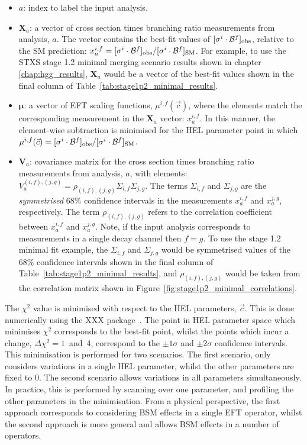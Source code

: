 \begin{itemize}
    \item $a$: index to label the input analysis.
    \item $\mathbf{X}_a$: a vector of cross section times branching ratio measurements from analysis, $a$. The vector contains the best-fit values of $[\sigma^i\cdot\mathcal{B}^f]_{\rm{obs}}$, relative to the SM prediction: $x^{i,f}_a=[\sigma^i\cdot\mathcal{B}^f]_{\rm{obs}}/[\sigma^i\cdot\mathcal{B}^f]_{\rm{SM}}$. For example, to use the \Hgg STXS stage 1.2 minimal merging scenario results shown in chapter \ref{chap:hgg_results}, $\mathbf{X}_a$ would be a vector of the best-fit values shown in the final column of Table~\ref{tab:stage1p2_minimal_results}.
    \item $\pmb{\mu}$: a vector of EFT scaling functions, $\mu^{i,f}(\vec{c})$, where the elements match the corresponding measurement in the $\mathbf{X}_a$ vector: $x^{i,f}_a$. In this manner, the element-wise subtraction is minimised for the HEL parameter point in which $\mu^{i,f}(\vec{c})=[\sigma^i\cdot\mathcal{B}^f]_{\rm{obs}}/[\sigma^i\cdot\mathcal{B}^f]_{\rm{SM}}$.
    \item $\mathbf{V}_a$: covariance matrix for the cross section times branching ratio measurements from analysis, $a$, with elements: $V^{(i,f),(j,g)}_a = \rho_{(i,f),(j,g)}\Sigma_{i,f}\Sigma_{j,g}$. The terms $\Sigma_{i,f}$ and $\Sigma_{j,g}$ are the \textit{symmetrised} 68\% confidence intervals in the measurements $x^{i,f}_a$ and $x^{j,g}_a$, respectively. The term $\rho_{(i,f),(j,g)}$ refers to the correlation coefficient between $x^{i,f}_a$ and $x^{j,g}_a$. Note, if the input analysis corresponds to measurements in a single decay channel then $f=g$. To use the \Hgg stage 1.2 minimal fit example, the $\Sigma_{i,f}$ and $\Sigma_{j,g}$ would be symmetrised values of the 68\% confidence intervals shown in the final column of Table~\ref{tab:stage1p2_minimal_results}, and $\rho_{(i,f),(j,g)}$ would be taken from the correlation matrix shown in Figure~\ref{fig:stage1p2_minimal_correlations}.
\end{itemize}

The $\chi^2$ value is minimised with respect to the HEL parameters, $\vec{c}$. This is done numerically using the XXX package~\cite{}. The point in HEL parameter space which minimises $\chi^2$ corresponds to the best-fit point, whilst the points which incur a change, $\Delta\chi^2=1$~and~4, correspond to the $\pm1\sigma$ and $\pm2\sigma$ confidence intervals. This minimisation is performed for two scenarios. The first scenario, only considers variations in a single HEL parameter, whilst the other parameters are fixed to 0. The second scenario allows variations in all parameters simultaneously. In practice, this is performed by scanning over one parameter, and profiling the other parameters in the minimisation. From a physical perspective, the first approach corresponds to considering BSM effects in a single EFT operator, whilst the second approach is more general and allows BSM effects in a number of operators.

